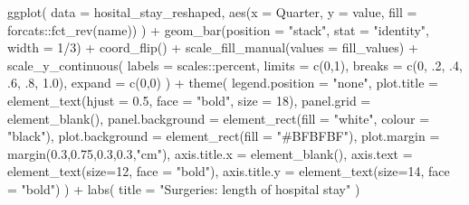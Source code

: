 \documentclass[
  letterpaper,
  DIV=11,
  numbers=noendperiod]{scrartcl}
\newenvironment{Shaded}{\begin{snugshade}}{\end{snugshade}}
\newcommand{\AttributeTok}[1]{\textcolor[rgb]{0.40,0.45,0.13}{#1}}
\newcommand{\DecValTok}[1]{\textcolor[rgb]{0.68,0.00,0.00}{#1}}
\newcommand{\FloatTok}[1]{\textcolor[rgb]{0.68,0.00,0.00}{#1}}
\newcommand{\FunctionTok}[1]{\textcolor[rgb]{0.28,0.35,0.67}{#1}}
\newcommand{\NormalTok}[1]{\textcolor[rgb]{0.00,0.23,0.31}{#1}}
\newcommand{\SpecialCharTok}[1]{\textcolor[rgb]{0.37,0.37,0.37}{#1}}
\newcommand{\StringTok}[1]{\textcolor[rgb]{0.13,0.47,0.30}{#1}}
\begin{document}
\begin{Shaded}
\begin{Highlighting}[]
  \FunctionTok{ggplot}\NormalTok{(}
    \AttributeTok{data =}\NormalTok{ hosital\_stay\_reshaped,}
    \FunctionTok{aes}\NormalTok{(}\AttributeTok{x =}\NormalTok{ Quarter, }\AttributeTok{y =}\NormalTok{ value, }\AttributeTok{fill =}\NormalTok{ forcats}\SpecialCharTok{::}\FunctionTok{fct\_rev}\NormalTok{(name))}
\NormalTok{    ) }\SpecialCharTok{+}
  \FunctionTok{geom\_bar}\NormalTok{(}\AttributeTok{position =} \StringTok{"stack"}\NormalTok{, }\AttributeTok{stat =} \StringTok{"identity"}\NormalTok{, }\AttributeTok{width =} \DecValTok{1}\SpecialCharTok{/}\DecValTok{3}\NormalTok{) }\SpecialCharTok{+}
  \FunctionTok{coord\_flip}\NormalTok{() }\SpecialCharTok{+}
  \FunctionTok{scale\_fill\_manual}\NormalTok{(}\AttributeTok{values =}\NormalTok{ fill\_values) }\SpecialCharTok{+}
  \FunctionTok{scale\_y\_continuous}\NormalTok{(}
    \AttributeTok{labels =}\NormalTok{ scales}\SpecialCharTok{::}\NormalTok{percent,}
    \AttributeTok{limits =} \FunctionTok{c}\NormalTok{(}\DecValTok{0}\NormalTok{,}\DecValTok{1}\NormalTok{),}
    \AttributeTok{breaks =} \FunctionTok{c}\NormalTok{(}\DecValTok{0}\NormalTok{, .}\DecValTok{2}\NormalTok{, .}\DecValTok{4}\NormalTok{, .}\DecValTok{6}\NormalTok{, .}\DecValTok{8}\NormalTok{, }\FloatTok{1.0}\NormalTok{),}
    \AttributeTok{expand =} \FunctionTok{c}\NormalTok{(}\DecValTok{0}\NormalTok{,}\DecValTok{0}\NormalTok{)}
\NormalTok{    ) }\SpecialCharTok{+}
  \FunctionTok{theme}\NormalTok{(}
    \AttributeTok{legend.position =} \StringTok{"none"}\NormalTok{,}
    \AttributeTok{plot.title =} \FunctionTok{element\_text}\NormalTok{(}\AttributeTok{hjust =} \FloatTok{0.5}\NormalTok{, }\AttributeTok{face =} \StringTok{"bold"}\NormalTok{, }\AttributeTok{size =} \DecValTok{18}\NormalTok{),}
    \AttributeTok{panel.grid =} \FunctionTok{element\_blank}\NormalTok{(),}
    \AttributeTok{panel.background =} \FunctionTok{element\_rect}\NormalTok{(}\AttributeTok{fill =} \StringTok{"white"}\NormalTok{, }\AttributeTok{colour =} \StringTok{"black"}\NormalTok{),}
    \AttributeTok{plot.background =} \FunctionTok{element\_rect}\NormalTok{(}\AttributeTok{fill =} \StringTok{"\#BFBFBF"}\NormalTok{),}
    \AttributeTok{plot.margin =} \FunctionTok{margin}\NormalTok{(}\FloatTok{0.3}\NormalTok{,}\FloatTok{0.75}\NormalTok{,}\FloatTok{0.3}\NormalTok{,}\FloatTok{0.3}\NormalTok{,}\StringTok{"cm"}\NormalTok{),}
    \AttributeTok{axis.title.x =} \FunctionTok{element\_blank}\NormalTok{(),}
    \AttributeTok{axis.text =} \FunctionTok{element\_text}\NormalTok{(}\AttributeTok{size=}\DecValTok{12}\NormalTok{, }\AttributeTok{face =} \StringTok{"bold"}\NormalTok{),}
    \AttributeTok{axis.title.y =} \FunctionTok{element\_text}\NormalTok{(}\AttributeTok{size=}\DecValTok{14}\NormalTok{, }\AttributeTok{face =} \StringTok{"bold"}\NormalTok{)}
\NormalTok{  ) }\SpecialCharTok{+}
  \FunctionTok{labs}\NormalTok{(}
    \AttributeTok{title =} \StringTok{"Surgeries: length of hospital stay"}
\NormalTok{  )}
\end{Highlighting}
\end{Shaded}
\end{document}
